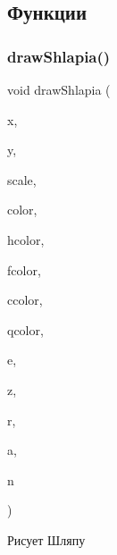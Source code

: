 \subsection{Функции}
\hypertarget{group___xD0_xA8_xD0_xBB_xD1_x8F_xD0_xBF_xD0_xB0_ga9df39a4ca466b91c0b469cbece358423}{}\label{group___xD0_xA8_xD0_xBB_xD1_x8F_xD0_xBF_xD0_xB0_ga9df39a4ca466b91c0b469cbece358423} 
\subsubsection{\texorpdfstring{draw\+Shlapia()}{drawShlapia()}}
{\footnotesize\ttfamily void draw\+Shlapia (\begin{DoxyParamCaption}\item[{int}]{x,  }\item[{int}]{y,  }\item[{double}]{scale,  }\item[{C\+O\+L\+O\+R\+R\+EF}]{color,  }\item[{C\+O\+L\+O\+R\+R\+EF}]{hcolor,  }\item[{C\+O\+L\+O\+R\+R\+EF}]{fcolor,  }\item[{C\+O\+L\+O\+R\+R\+EF}]{ccolor,  }\item[{C\+O\+L\+O\+R\+R\+EF}]{qcolor,  }\item[{int}]{e,  }\item[{int}]{z,  }\item[{int}]{r,  }\item[{int}]{a,  }\item[{int}]{n }\end{DoxyParamCaption})}



Рисует Шляпу 


